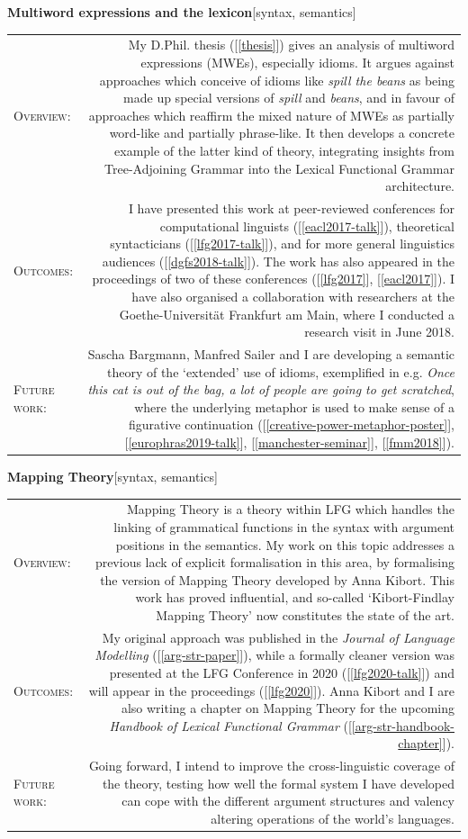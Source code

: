 \documentclass[11pt,a4paper]{article}
\makeatletter
\newlength{\rulelength}%
\newcommand{\REx}[2]{%
\vspace*{0.1\baselineskip}%
{\large\textbf{#1}\hfill\textnormal{[#2]}}%
\vspace*{0.5\baselineskip}%
}
\newenvironment{cvsection}{%
  \setlength{\extrarowheight}{0.70ex}
  \begin{longtable}[l]{@{} L R @{}}
}{%
  \end{longtable}
}
\newcommand{\sref}[1]{[\ref{#1}]}
\newcommand{\researchsubhead}[1]{%
\textsc{#1}:%
}
\makeatother
\begin{document}
\REx{Multiword expressions and the lexicon}{syntax, semantics}
\begin{cvsection}
  \researchsubhead{Overview} &%
  My D.Phil. thesis (\sref{thesis}) gives an analysis of multiword expressions
  (MWEs), especially idioms. It argues against approaches which conceive of
  idioms like \emph{spill the beans} as being made up special versions of
  \emph{spill} and \emph{beans}, and in favour of approaches which reaffirm the
  mixed nature of MWEs as partially word-like and partially phrase-like. It then
  develops a concrete example of the latter kind of theory, integrating insights
  from Tree-Adjoining Grammar into the Lexical Functional Grammar architecture.%
  \\
  \researchsubhead{Outcomes} &%
  I have presented this work at peer-reviewed conferences for computational
  linguists (\sref{eacl2017-talk}), theoretical syntacticians
  (\sref{lfg2017-talk}), and for more general linguistics audiences
  (\sref{dgfs2018-talk}). The work has also appeared in the proceedings of two
  of these conferences (\sref{lfg2017}, \sref{eacl2017}). I have also organised
  a collaboration with researchers at the Goethe-Universit\"{a}t Frankfurt am
  Main, where I conducted a research visit in June 2018.
  \\
  \researchsubhead{Future work} &%
  Sascha Bargmann, Manfred Sailer and I are developing a semantic theory of the
  `extended' use of idioms, exemplified in e.g. \textit{Once this cat is out of
    the bag, a lot of people are going to get scratched}, where the underlying
  metaphor is used to make sense of a figurative continuation
  (\sref{creative-power-metaphor-poster}, \sref{europhras2019-talk},
  \sref{manchester-seminar}, \sref{fmm2018}).
\end{cvsection}

\REx{Mapping Theory}{syntax, semantics}
\begin{cvsection}
  \researchsubhead{Overview} &%
  Mapping Theory is a theory within LFG which handles the linking of grammatical
  functions in the syntax with argument positions in the semantics. My work on
  this topic addresses a previous lack of explicit formalisation in this area,
  by formalising the version of Mapping Theory developed by Anna Kibort. This
  work has proved influential, and so-called `Kibort-Findlay Mapping Theory' now
  constitutes the state of the art.
  \\
  \researchsubhead{Outcomes} &%
  My original approach was published in the \textit{Journal of Language
    Modelling} (\sref{arg-str-paper}), while a formally cleaner version was
  presented at the LFG Conference in 2020 (\sref{lfg2020-talk}) and will appear
  in the proceedings (\sref{lfg2020}). Anna Kibort and I are also writing a
  chapter on Mapping Theory for the upcoming \textit{Handbook of Lexical
    Functional Grammar} (\sref{arg-str-handbook-chapter}).
  \\
  \researchsubhead{Future work} &%
  Going forward, I intend to improve the cross-linguistic coverage of the
  theory, testing how well the formal system I have developed can cope with the
  different argument structures and valency altering operations of the world's
  languages.
\end{cvsection}
\end{document}
